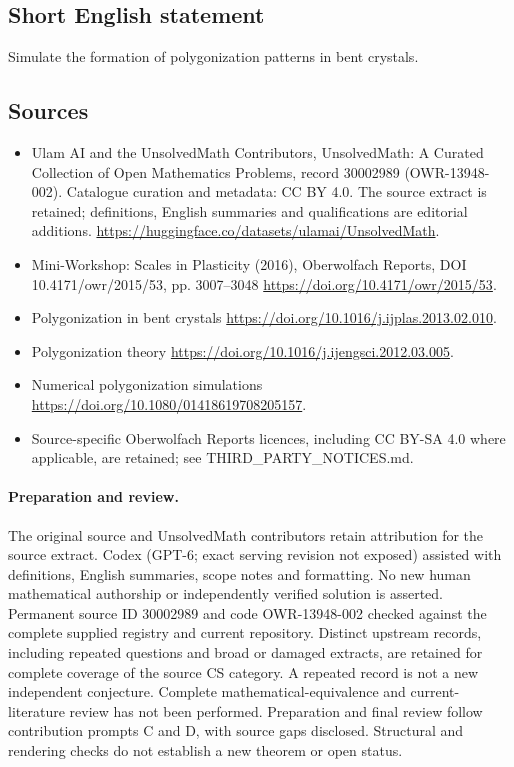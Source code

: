 \documentclass[11pt]{article}
\begin{document}
\subsection{Short English statement}
Simulate the formation of polygonization patterns in bent crystals.
\subsection{Sources}
\begin{itemize}
\item[\hypertarget{source:30002989:1}{S1}] Ulam AI and the UnsolvedMath Contributors, UnsolvedMath: A Curated Collection of Open Mathematics Problems, record 30002989 (OWR-13948-002). Catalogue curation and metadata: CC BY 4.0. The source extract is retained; definitions, English summaries and qualifications are editorial additions.
\url{https://huggingface.co/datasets/ulamai/UnsolvedMath}.
\item[\hypertarget{source:30002989:2}{S2}] Mini-Workshop: Scales in Plasticity (2016), Oberwolfach Reports, DOI 10.4171/owr/2015/53, pp. 3007--3048
\url{https://doi.org/10.4171/owr/2015/53}.
\item[\hypertarget{source:30002989:3}{S3}] Polygonization in bent crystals
\url{https://doi.org/10.1016/j.ijplas.2013.02.010}.
\item[\hypertarget{source:30002989:4}{S4}] Polygonization theory
\url{https://doi.org/10.1016/j.ijengsci.2012.03.005}.
\item[\hypertarget{source:30002989:5}{S5}] Numerical polygonization simulations
\url{https://doi.org/10.1080/01418619708205157}.
\item Source-specific Oberwolfach Reports licences, including CC BY-SA 4.0 where applicable, are retained; see THIRD\_PARTY\_NOTICES.md.
\end{itemize}
\paragraph{Preparation and review.}
The original source and UnsolvedMath contributors retain attribution for the source extract. Codex (GPT-6; exact serving revision not exposed) assisted with definitions, English summaries, scope notes and formatting. No new human mathematical authorship or independently verified solution is asserted. Permanent source ID 30002989 and code OWR-13948-002 checked against the complete supplied registry and current repository. Distinct upstream records, including repeated questions and broad or damaged extracts, are retained for complete coverage of the source CS category. A repeated record is not a new independent conjecture. Complete mathematical-equivalence and current-literature review has not been performed. Preparation and final review follow contribution prompts C and D, with source gaps disclosed. Structural and rendering checks do not establish a new theorem or open status.
\label{end:30002989}
\end{document}
